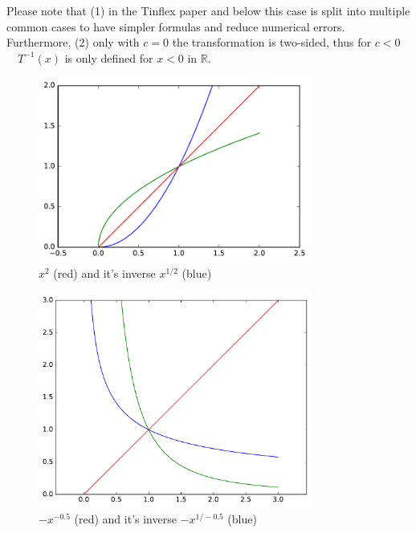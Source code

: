 Please note that (1) in the Tinflex paper and below this case is split into multiple common cases to have simpler formulas and reduce numerical errors.
Furthermore, (2) only with $c = 0$ the transformation is two-sided, thus for $c < 0$\ \ $T^{-1}(x)$ is only defined for $x < 0$ in $\mathbb{R}$.

\begin{figure}[h!]
\centering
\includegraphics[width=0.8\textwidth]{figs/a_2_sgn_pow.pdf}
\caption{$x^2$ (red) and it's inverse $x^{1/2}$ (blue)}
\label{fig:sgn_pow}
\end{figure}

\begin{figure}[h!]
\centering
\includegraphics[width=0.8\textwidth]{figs/a_0_5_sgn_pow.pdf}
\caption{$-x^{-0.5}$ (red) and it's inverse $-x^{1/-0.5}$ (blue)}
\label{fig:sgn_pow_0_5}
\end{figure}

\pagebreak

\ \\

\pagebreak

